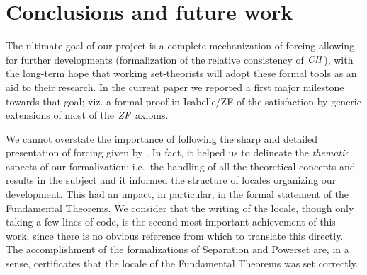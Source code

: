 \section{Conclusions and future work}
\label{sec:conclusions-future-work}

The ultimate goal of our project is a complete mechanization of
forcing allowing for further developments (formalization of the
relative consistency of $\mathit{CH}$), with the long-term hope that 
working set-theorists will adopt these formal tools as an aid to their
research. In the current paper we reported a first major
milestone towards that goal; viz. a formal proof in Isabelle/ZF of the
satisfaction by generic extensions of most of the $\mathit{ZF}$ axioms.%

We cannot overstate the importance of following the sharp and detailed 
presentation of forcing given by
\citet{kunen2011set}. In fact, it helped us to delineate the
\emph{thematic} aspects of our formalization; i.e.~the handling of all
the theoretical concepts and results in the subject and it informed
the structure of locales organizing our development. This had an
impact, in particular, in the formal statement of the Fundamental
Theorems. We consider that the writing of the 
locale, though only taking a few lines of code, is the second most
important achievement of this work, since there is no obvious
reference from which to translate this directly. The accomplishment
of the formalizations of Separation and Powerset are, in a sense,
certificates that the locale of the Fundamental Theorems was set
correctly.



